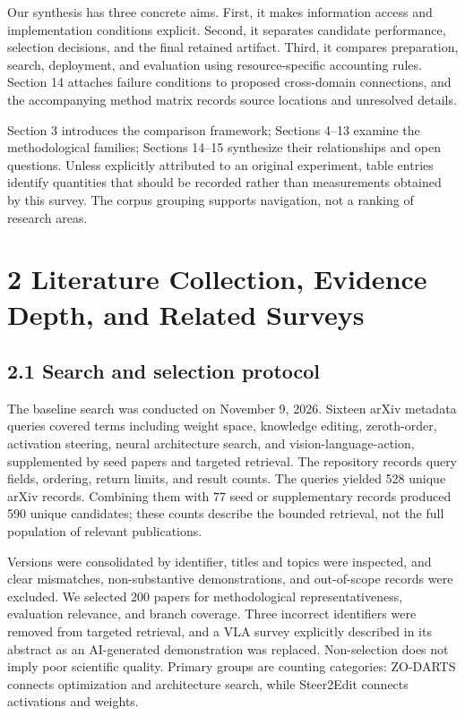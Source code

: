 Our synthesis has three concrete aims. First, it makes information access and implementation conditions explicit. Second, it separates candidate performance, selection decisions, and the final retained artifact. Third, it compares preparation, search, deployment, and evaluation using resource-specific accounting rules. Section 14 attaches failure conditions to proposed cross-domain connections, and the accompanying method matrix records source locations and unresolved details.


Section 3 introduces the comparison framework; Sections 4–13 examine the methodological families; Sections 14–15 synthesize their relationships and open questions. Unless explicitly attributed to an original experiment, table entries identify quantities that should be recorded rather than measurements obtained by this survey. The corpus grouping supports navigation, not a ranking of research areas.


\section*{2 Literature Collection, Evidence Depth, and Related Surveys}

\subsection*{2.1 Search and selection protocol}

The baseline search was conducted on November 9, 2026. Sixteen arXiv metadata queries covered terms including weight space, knowledge editing, zeroth-order, activation steering, neural architecture search, and vision-language-action, supplemented by seed papers and targeted retrieval. The repository records query fields, ordering, return limits, and result counts. The queries yielded 528 unique arXiv records. Combining them with 77 seed or supplementary records produced 590 unique candidates; these counts describe the bounded retrieval, not the full population of relevant publications.


Versions were consolidated by identifier, titles and topics were inspected, and clear mismatches, non-substantive demonstrations, and out-of-scope records were excluded. We selected 200 papers for methodological representativeness, evaluation relevance, and branch coverage. Three incorrect identifiers were removed from targeted retrieval, and a VLA survey explicitly described in its abstract as an AI-generated demonstration was replaced. Non-selection does not imply poor scientific quality. Primary groups are counting categories: ZO-DARTS connects optimization and architecture search, while Steer2Edit connects activations and weights.\cite{r75,r120}


